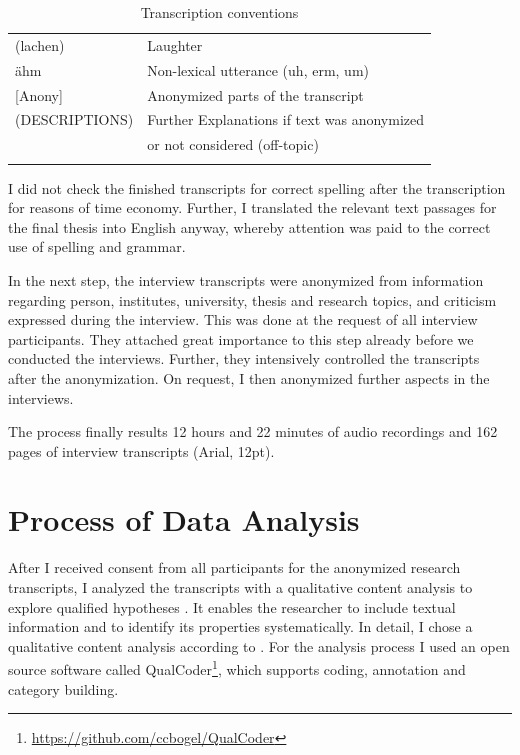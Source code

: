 \documentclass[12pt,a4paper,titlepage,oneside,abstract=true,toc=listof,toc=bibliography]{scrreprt}
\begin{document}
\small
\begin{table}
\caption{Transcription conventions}
\centering
\begin{tabular}{ll}
 & \\
\hline
\hline
 	(lachen) & Laughter\\
 	ähm	& Non-lexical utterance (uh, erm, um)\\
 	{[Anony]} & Anonymized parts of the transcript\\
	(DESCRIPTIONS)	& Further Explanations if text was anonymized\\
	               & or not considered (off-topic)\\
\hline
 & \\
\end{tabular}
\end{table}
\normalsize

I did not check the finished transcripts for correct spelling after the transcription for reasons of time economy. Further, I translated the relevant text passages for the final thesis into English anyway, whereby attention was paid to the correct use of spelling and grammar.

In the next step, the interview transcripts were anonymized from information regarding person, institutes, university, thesis and research topics, and criticism expressed during the interview. This was done at the request of all interview participants. They attached great importance to this step already before we conducted the interviews. Further, they intensively controlled the transcripts after the anonymization. On request, I then anonymized further aspects in the interviews.

The process finally results 12 hours and 22 minutes of audio recordings and 162 pages of interview transcripts (Arial, 12pt). 

\section{Process of Data Analysis}
After I received consent from all participants for the anonymized research transcripts, I analyzed the transcripts with a qualitative content analysis to explore qualified hypotheses \citep{Kohlbacher2006, Krippendorff2012, Mayring2000, Mayring2014}. It enables the researcher to include textual information and to identify its properties systematically. In detail, I chose a qualitative content analysis according to \citet{Mayring2014}. For the analysis process I used an open source software called QualCoder\footnote{\url{https://github.com/ccbogel/QualCoder}}, which supports coding, annotation and category building. 
\end{document}
